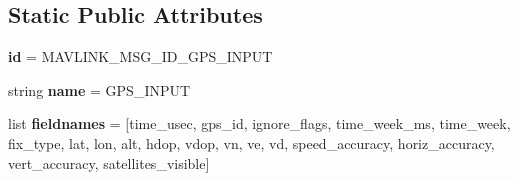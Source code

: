 \subsection*{Static Public Attributes}
\begin{DoxyCompactItemize}
\item 
\mbox{\label{classpymavlink_1_1dialects_1_1v10_1_1MAVLink__gps__input__message_a96b673be4b9db923a4aded28cbbb7f56}} 
{\bfseries id} = M\+A\+V\+L\+I\+N\+K\+\_\+\+M\+S\+G\+\_\+\+I\+D\+\_\+\+G\+P\+S\+\_\+\+I\+N\+P\+UT
\item 
\mbox{\label{classpymavlink_1_1dialects_1_1v10_1_1MAVLink__gps__input__message_a555e4270445238b4f2c0313c5d2b5f59}} 
string {\bfseries name} = \textquotesingle{}G\+P\+S\+\_\+\+I\+N\+P\+UT\textquotesingle{}
\item 
\mbox{\label{classpymavlink_1_1dialects_1_1v10_1_1MAVLink__gps__input__message_a658c9913a8d27ee190d627995fe6bc14}} 
list {\bfseries fieldnames} = \mbox{[}\textquotesingle{}time\+\_\+usec\textquotesingle{}, \textquotesingle{}gps\+\_\+id\textquotesingle{}, \textquotesingle{}ignore\+\_\+flags\textquotesingle{}, \textquotesingle{}time\+\_\+week\+\_\+ms\textquotesingle{}, \textquotesingle{}time\+\_\+week\textquotesingle{}, \textquotesingle{}fix\+\_\+type\textquotesingle{}, \textquotesingle{}lat\textquotesingle{}, \textquotesingle{}lon\textquotesingle{}, \textquotesingle{}alt\textquotesingle{}, \textquotesingle{}hdop\textquotesingle{}, \textquotesingle{}vdop\textquotesingle{}, \textquotesingle{}vn\textquotesingle{}, \textquotesingle{}ve\textquotesingle{}, \textquotesingle{}vd\textquotesingle{}, \textquotesingle{}speed\+\_\+accuracy\textquotesingle{}, \textquotesingle{}horiz\+\_\+accuracy\textquotesingle{}, \textquotesingle{}vert\+\_\+accuracy\textquotesingle{}, \textquotesingle{}satellites\+\_\+visible\textquotesingle{}\mbox{]}
\item 
\mbox{\label{classpymavlink_1_1dialects_1_1v10_1_1MAVLink__gps__input__message_a18d053b18c1020860d99353081fe66f3}} 

\end{DoxyCompactItemize}
